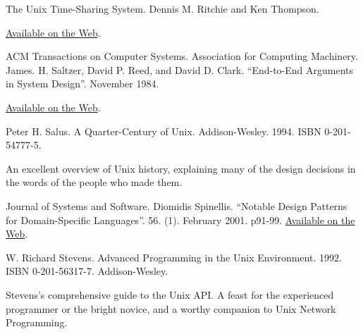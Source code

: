 \documentclass[12pt,oneside]{book}
\begin{document}
\begin{common-format}
\begin{thebibliography}{9}
 The Unix Time-Sharing System. Dennis M. Ritchie and Ken Thompson.

\href{http://cm.bell-labs.com/cm/cs/who/dmr/cacm.html}{Available on the Web}.

 ACM Transactions on Computer Systems. Association for Computing Machinery. James. H. Saltzer, David P. Reed, and David D. Clark. “End-to-End Arguments in System Design”. November 1984.

\href{http://web.mit.edu/Saltzer/www/publications/endtoend/endtoend.pdf}{Available on the Web}.

 Peter H. Salus. A Quarter-Century of Unix. Addison-Wesley. 1994. ISBN 0-201-54777-5.

An excellent overview of Unix history, explaining many of the design decisions in the words of the people who made them.

%
%
%
 Journal of Systems and Software. Diomidis Spinellis. “Notable Design Patterns for Domain-Specific Languages”. 56. (1). February 2001. p91-99. \href{http://www.catb.org/~esr/writings/taoup/html/apb.html}{Available on the Web}.

%
%
%
%
%

 W. Richard Stevens. Advanced Programming in the Unix Environment. 1992. ISBN 0-201-56317-7. Addison-Wesley.

Stevens's comprehensive guide to the Unix API. A feast for the experienced programmer or the bright novice, and a worthy companion to Unix Network Programming.


\end{thebibliography}
\end{common-format}
\end{document}
